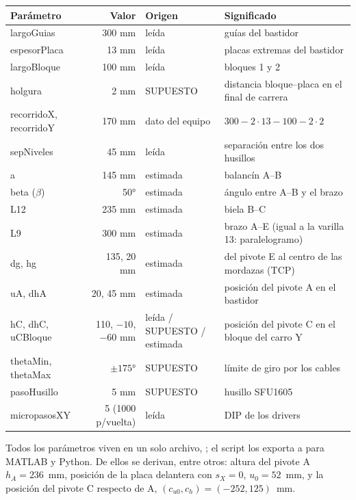 \begin{center}\small
\begin{longtable}{>{\ttfamily}p{2.6cm} r >{\raggedright}p{2cm} >{\raggedright\arraybackslash}p{8cm}}
\toprule
\textbf{\rmfamily Parámetro} & \textbf{Valor} & \textbf{Origen} & \textbf{Significado}\\
\midrule
\endhead
largoGuias & 300 mm & leída & guías del bastidor\\
espesorPlaca & 13 mm & leída & placas extremas del bastidor\\
largoBloque & 100 mm & leída & bloques 1 y 2\\
holgura & 2 mm & SUPUESTO & distancia bloque--placa en el final de carrera\\
recorridoX, recorridoY & 170 mm & dato del equipo & $300 - 2\cdot13 - 100 - 2\cdot2$\\
sepNiveles & 45 mm & leída & separación entre los dos husillos\\
a & 145 mm & estimada & balancín A--B\\
beta ($\beta$) & 50° & estimada & ángulo entre A--B y el brazo\\
L12 & 235 mm & estimada & biela B--C\\
L9 & 300 mm & estimada & brazo A--E (igual a la varilla 13: paralelogramo)\\
dg, hg & 135, 20 mm & estimada & del pivote E al centro de las mordazas (TCP)\\
uA, dhA & 20, 45 mm & estimada & posición del pivote A en el bastidor\\
hC, dhC, uCBloque & 110, $-10$, $-60$ mm & leída / SUPUESTO / estimada & posición del pivote C en el bloque del carro Y\\
thetaMin, thetaMax & $\pm175$° & SUPUESTO & límite de giro por los cables\\
pasoHusillo & 5 mm & SUPUESTO & husillo SFU1605\\
micropasosXY & 5 (1000 p/vuelta) & leída & DIP de los drivers\\
\bottomrule
\end{longtable}
\end{center}
Todos los parámetros viven en un solo archivo, ; el script  los exporta a  para MATLAB y Python. De ellos se derivan, entre otros: altura del pivote A $h_A = 236$~mm, posición de la placa delantera con $s_X = 0$, $u_0 = 52$~mm, y la posición del pivote C respecto de A, $(c_{u0}, c_h) = (-252, 125)$~mm.

